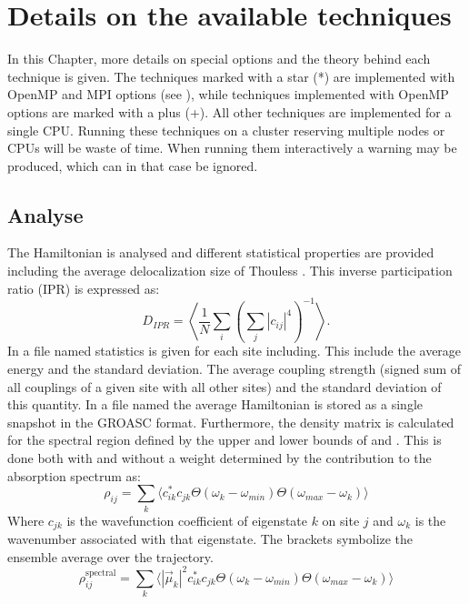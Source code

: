 \chapter{\label{chap:techniques}Details on the available techniques}
In this Chapter, more details on special options and the theory behind each technique is given.
The techniques marked with a star (*) are implemented with OpenMP and MPI options (see \cite{Sardjan_2020}), while techniques implemented with OpenMP options are marked with a plus (+).
All other techniques are implemented for a single CPU.
Running these techniques on a cluster reserving multiple nodes or CPUs will be waste of time.
When running them interactively a warning may be produced, which can in that case be ignored.

\section{Analyse}
The Hamiltonian is analysed and different statistical properties are provided including the average delocalization size of Thouless \cite{Thouless.1974.PR.13.93}.
This inverse participation ratio (IPR) is expressed as:
\begin{equation}
	D_{IPR}=\left\langle\frac{1}{N}\sum_i\left(\sum_j |c_{ij}|^{4}\right)^{-1}\right\rangle.
\end{equation}
In a file named  statistics is given for each site including.
This include the average energy and the standard deviation.
The average coupling strength (signed sum of all couplings of a given site with all other sites) and the standard deviation of this quantity.
In a file named  the average Hamiltonian is stored as a single snapshot in the GROASC format.
Furthermore, the density matrix is calculated for the spectral region defined by the upper and lower bounds of  and .
This is done both with and without a weight determined by the contribution to the absorption spectrum as:
\begin{equation}
\rho_{ij}=\sum_k \Big\langle c_{ik}^* c_{jk}  \Theta(\omega_{k}-\omega_{min})\Theta(\omega_{max}-\omega_k)\Big\rangle
\end{equation}
Where $c_{jk}$ is the wavefunction coefficient of eigenstate $k$ on site $j$ and $\omega_k$ is the wavenumber associated with that eigenstate.
The brackets symbolize the ensemble average over the trajectory.
\begin{equation}
\rho^{\textrm{spectral}}_{ij}=\sum_k \Big\langle |\vec{\mu}_k|^2 c_{ik}^* c_{jk}  \Theta(\omega_{k}-\omega_{min})\Theta(\omega_{max}-\omega_k)\Big\rangle
\end{equation}
